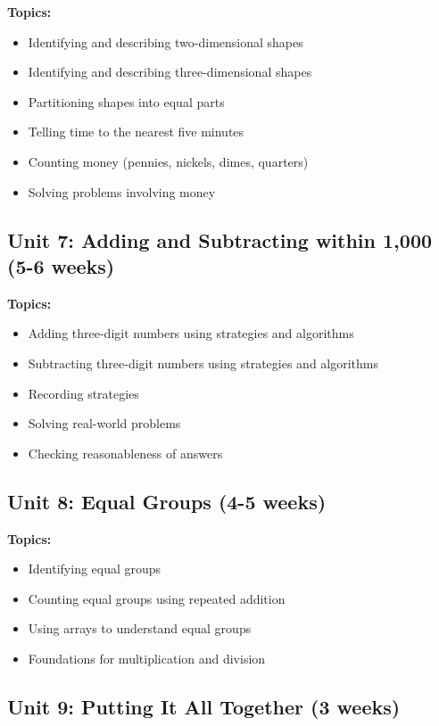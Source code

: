 \documentclass[11pt,letterpaper]{report}
\begin{document}
\textbf{Topics:}
\begin{itemize}
    \item Identifying and describing two-dimensional shapes
    \item Identifying and describing three-dimensional shapes
    \item Partitioning shapes into equal parts
    \item Telling time to the nearest five minutes
    \item Counting money (pennies, nickels, dimes, quarters)
    \item Solving problems involving money
\end{itemize}

\subsection{Unit 7: Adding and Subtracting within 1,000 (5-6 weeks)}

\textbf{Topics:}
\begin{itemize}
    \item Adding three-digit numbers using strategies and algorithms
    \item Subtracting three-digit numbers using strategies and algorithms
    \item Recording strategies
    \item Solving real-world problems
    \item Checking reasonableness of answers
\end{itemize}

\subsection{Unit 8: Equal Groups (4-5 weeks)}

\textbf{Topics:}
\begin{itemize}
    \item Identifying equal groups
    \item Counting equal groups using repeated addition
    \item Using arrays to understand equal groups
    \item Foundations for multiplication and division
\end{itemize}

\subsection{Unit 9: Putting It All Together (3 weeks)}
\end{document}
